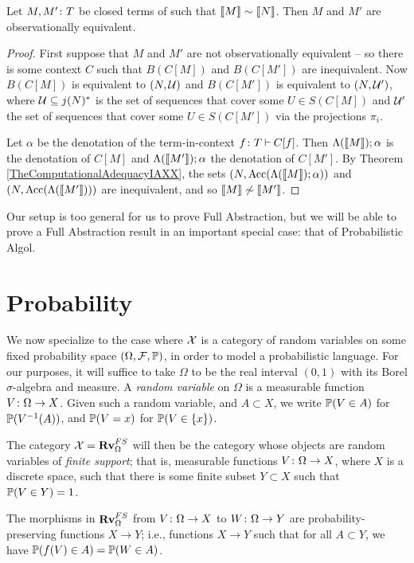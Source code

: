 \begin{theorem}
  Let $M,M'\colon T$ be closed terms of \IAXX such that $\left\llbracket M\right\rrbracket\sim\left\llbracket N\right\rrbracket$.
  Then $M$ and $M'$ are observationally equivalent.
\end{theorem}
\begin{proof}
  First suppose that $M$ and $M'$ are not observationally equivalent -- so there is some context $C$ such that $B(C[M])$ and $B(C[M'])$ are inequivalent.
  Now $B(C[M])$ is equivalent to $(N,\mathcal U)$ and $B(C[M'])$ is equivalent to $(N,\mathcal U')$, where $\mathcal U\subseteq j(N)^*$ is the set of sequences that cover some $U\in S(C[M])$ and $\mathcal U'$ the set of sequences that cover some $U\in S(C[M'])$ via the projections $\pi_i$.

  Let $\alpha$ be the denotation of the term-in-context $f\colon T \mathbin{\vdash} C[f]$.  
  Then $\Lambda(\left\llbracket M\right\rrbracket);\alpha$ is the denotation of $C[M]$ and $\Lambda(\left\llbracket M'\right\rrbracket);\alpha$ the denotation of $C[M']$.  
  By Theorem \ref{TheComputationalAdequacyIAXX}, the sets $(N,\operatorname{Acc}(\Lambda(\left\llbracket M\right\rrbracket);\alpha))$ and $(N,\operatorname{Acc}(\Lambda(\left\llbracket M'\right\rrbracket)))$ are inequivalent, and so $\left\llbracket M\right\rrbracket \not\sim\left\llbracket M'\right\rrbracket$.
\end{proof}

Our setup is too general for us to prove Full Abstraction, but we will be able to prove a Full Abstraction result in an important special case: that of Probabilistic Algol.

\section{Probability}

We now specialize to the case where $\mathcal X$ is a category of random variables on some fixed probability space $(\Omega,\mathcal F,\mathbb{P})$, in order to model a probabilistic language.
For our purposes, it will suffice to take $\Omega$ to be the real interval $(0,1)$ with its Borel $\sigma$-algebra and measure.
A \emph{random variable} on $\Omega$ is a measurable function $V \colon \Omega \to X$.  
Given such a random variable, and $A\subset X$, we write $\mathbb{P}(V \in A)$ for $\mathbb{P}(V^{-1}(A))$, and $\mathbb{P}(V = x)$ for $\mathbb{P}(V \in \{x\})$.

The category $\mathcal X = {\normalfont\textbf{Rv}}_\Omega^{FS}$ will then be the category whose objects are random variables of \emph{finite support}; that is, measurable functions $V\colon\Omega \to X$, where $X$ is a discrete space, such that there is some finite subset $Y\subset X$ such that $\mathbb{P}(V\in Y) = 1$.

The morphisms in ${\normalfont\textbf{Rv}}_\Omega^{FS}$ from $V\colon \Omega \to X$ to $W \colon \Omega \to Y$ are probability-preserving functions $X \to Y$; i.e., functions $X \to Y$ such that for all $A \subset Y$, we have $\mathbb{P}(f(V) \in A) = \mathbb{P}(W \in A)$.

